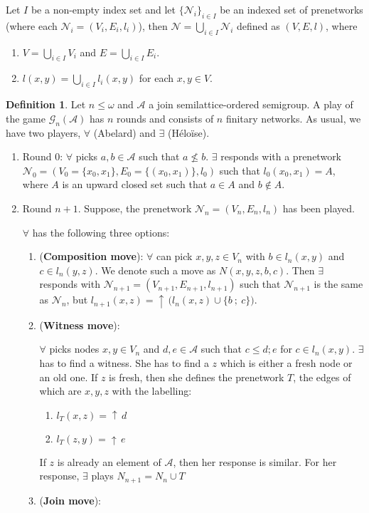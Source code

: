 \documentclass[a4paper]{article}
\theoremstyle{definition}
\newtheorem{definition}{Definition}
\theoremstyle{theorem}
\theoremstyle{proposition}
\theoremstyle{lemma}
\theoremstyle{ex}
\theoremstyle{corollary}
\theoremstyle{claim}
\newcommand{\up}[1]{\ensuremath{{\uparrow}\,#1}}
\begin{document}
Let $I$ be a non-empty index set and let $\{ \mathcal{N}_i \}_{i \in I}$ be an indexed set of prenetworks (where each $\mathcal{N}_i = (V_i, E_i, l_i)$), then $\mathcal{N} = \bigcup \limits_{i \in I} \mathcal{N}_i$ defined as $(V, E, l)$, where

\begin{enumerate}
  \item $V = \bigcup \limits_{i \in I} V_i$ and $E = \bigcup \limits_{i \in I} E_i$.
  \item $l(x, y) = \bigcup \limits_{ i \in I } l_i(x, y)$ for each $x, y \in V$.
\end{enumerate}

\begin{definition}
  Let $n \leq \omega$ and $\mathcal{A}$ a join semilattice-ordered semigroup. A play of the game $\mathcal{G}_n(\mathcal{A})$ has $n$ rounds and consists of $n$ finitary networks. As usual, we have two players, $\forall$ (Abelard) and $\exists$ (H\'{e}lo\"{i}se).

  \begin{enumerate}
    \item Round $0$: $\forall$ picks $a, b \in \mathcal{A}$ such that $a \not\leq b$. $\exists$ responds with a prenetwork $\mathcal{N}_0 = (V_0 = \{ x_0, x_1 \}, E_0 = \{ (x_0, x_1)\}, l_0)$ such that $l_0(x_0, x_1) = A$, where $A$ is an upward closed set such that $a \in A$ and $b \notin A$.
    \item Round $n + 1$. Suppose, the prenetwork $\mathcal{N}_n = (V_n, E_n, l_n)$ has been played.

    $\forall$ has the following three options:
    \begin{enumerate}
      \item ({\bf Composition move}): $\forall$ can pick $x, y, z \in V_n$ with $b \in l_n(x, y)$ and $c \in l_n(y, z)$. We denote such a move as $N(x,y,z,b,c)$. Then $\exists$ responds with $\mathcal{N}_{n + 1} = (V_{n + 1}, E_{n + 1}, l_{n + 1})$ such that $\mathcal{N}_{n + 1}$
      is the same as $\mathcal{N}_n$, but $l_{n + 1}(x, z) = \up{(l_{n}(x, z)} \cup \{ b \: ; \: c \})$.
      \item ({\bf Witness move}):

      $\forall$ picks nodes $x, y \in V_n$ and $d, e \in \mathcal{A}$ such that $c \leq d ; e$ for $c \in l_n(x, y)$. $\exists$ has to find a witness. She has to find a $z$ which is either a fresh node or an old one. If $z$ is fresh, then she defines the prenetwork $T$, the edges of which are $x, y, z$ with the labelling:
      \begin{enumerate}
        \item $l_T(x, z) = \up{d}$
        \item $l_T(z, y) = \up{e}$
      \end{enumerate}
      If $z$ is already an element of $\mathcal{A}$, then her response is similar.
      For her response, $\exists$ plays $N_{n + 1} = N_n \cup T$
      \item ({\bf Join move}):


\end{enumerate}
\end{enumerate}
\end{definition}
\end{document}
